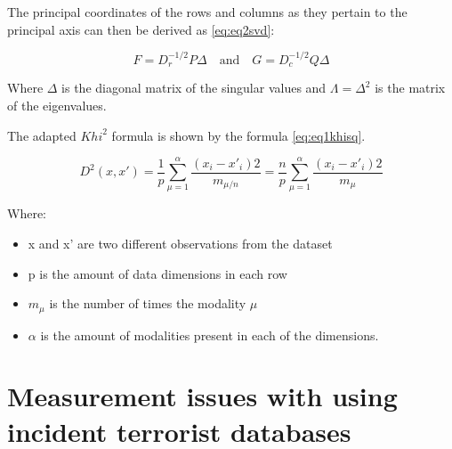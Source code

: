 The principal coordinates of the rows and columns as they pertain to the principal axis can then be derived as \ref{eq:eq2svd}:   

\begin{equation}  F=D_{r}^{-1/2}P\Delta  \quad \textrm{and} \quad G=D_{c}^{-1/2}Q\Delta \label{eq:eq2svd} \end{equation}

Where $\Delta$ is the diagonal matrix of the singular values and $\Lambda = {\Delta}^2$ is the matrix of the eigenvalues.

The adapted ${Khi}^2$ formula is shown by the formula \ref{eq:eq1khisq}.

\begin{equation} D^{2}(x,x')=\frac{1}{p}\sum^{\alpha}_{\mu =1} \frac{(x_{i}-x'_{i})2}{m_{\mu /n}} = \frac{n}{p}\sum^{\alpha}_{\mu =1}\frac{(x_{i}-x'_{i})2}{m_{\mu }} \label{eq:eq1khisq} \end{equation}

Where:
\begin{itemize}
\item[] x and x' are two different observations from the dataset
\item[] p is the amount of data dimensions in each row
\item[] $m_{\mu}$ is the number of times the modality $\mu$
\item[] $\alpha$ is the amount of modalities present in each of the dimensions.
\end{itemize}

\section{Measurement issues with using incident terrorist databases} \label{sec:markermeasdif}

